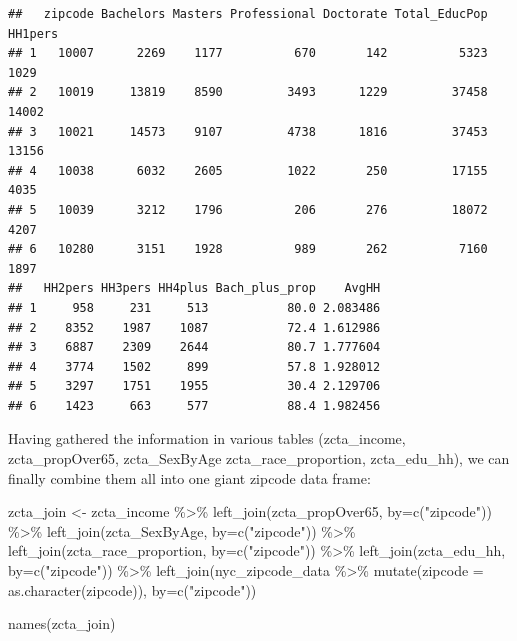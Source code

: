 \documentclass[
  openany]{book}
\newenvironment{Shaded}{\begin{snugshade}}{\end{snugshade}}
\newcommand{\AttributeTok}[1]{\textcolor[rgb]{0.77,0.63,0.00}{#1}}
\newcommand{\FunctionTok}[1]{\textcolor[rgb]{0.00,0.00,0.00}{#1}}
\newcommand{\NormalTok}[1]{#1}
\newcommand{\OtherTok}[1]{\textcolor[rgb]{0.56,0.35,0.01}{#1}}
\newcommand{\SpecialCharTok}[1]{\textcolor[rgb]{0.00,0.00,0.00}{#1}}
\newcommand{\StringTok}[1]{\textcolor[rgb]{0.31,0.60,0.02}{#1}}
\begin{document}
\begin{verbatim}
##   zipcode Bachelors Masters Professional Doctorate Total_EducPop HH1pers
## 1   10007      2269    1177          670       142          5323    1029
## 2   10019     13819    8590         3493      1229         37458   14002
## 3   10021     14573    9107         4738      1816         37453   13156
## 4   10038      6032    2605         1022       250         17155    4035
## 5   10039      3212    1796          206       276         18072    4207
## 6   10280      3151    1928          989       262          7160    1897
##   HH2pers HH3pers HH4plus Bach_plus_prop    AvgHH
## 1     958     231     513           80.0 2.083486
## 2    8352    1987    1087           72.4 1.612986
## 3    6887    2309    2644           80.7 1.777604
## 4    3774    1502     899           57.8 1.928012
## 5    3297    1751    1955           30.4 2.129706
## 6    1423     663     577           88.4 1.982456
\end{verbatim}

Having gathered the information in various tables (zcta\_income, zcta\_propOver65, zcta\_SexByAge
zcta\_race\_proportion, zcta\_edu\_hh), we can finally combine them all into one giant zipcode data frame:

\begin{Shaded}
\begin{Highlighting}[]
\NormalTok{zcta\_join }\OtherTok{\textless{}{-}}\NormalTok{ zcta\_income }\SpecialCharTok{\%\textgreater{}\%} 
  \FunctionTok{left\_join}\NormalTok{(zcta\_propOver65, }\AttributeTok{by=}\FunctionTok{c}\NormalTok{(}\StringTok{"zipcode"}\NormalTok{)) }\SpecialCharTok{\%\textgreater{}\%}
  \FunctionTok{left\_join}\NormalTok{(zcta\_SexByAge, }\AttributeTok{by=}\FunctionTok{c}\NormalTok{(}\StringTok{"zipcode"}\NormalTok{)) }\SpecialCharTok{\%\textgreater{}\%}
  \FunctionTok{left\_join}\NormalTok{(zcta\_race\_proportion, }\AttributeTok{by=}\FunctionTok{c}\NormalTok{(}\StringTok{"zipcode"}\NormalTok{)) }\SpecialCharTok{\%\textgreater{}\%}
  \FunctionTok{left\_join}\NormalTok{(zcta\_edu\_hh, }\AttributeTok{by=}\FunctionTok{c}\NormalTok{(}\StringTok{"zipcode"}\NormalTok{)) }\SpecialCharTok{\%\textgreater{}\%}
  \FunctionTok{left\_join}\NormalTok{(nyc\_zipcode\_data }\SpecialCharTok{\%\textgreater{}\%} \FunctionTok{mutate}\NormalTok{(}\AttributeTok{zipcode =} \FunctionTok{as.character}\NormalTok{(zipcode)), }
            \AttributeTok{by=}\FunctionTok{c}\NormalTok{(}\StringTok{"zipcode"}\NormalTok{))}

\FunctionTok{names}\NormalTok{(zcta\_join)}
\end{Highlighting}
\end{Shaded}
\end{document}
